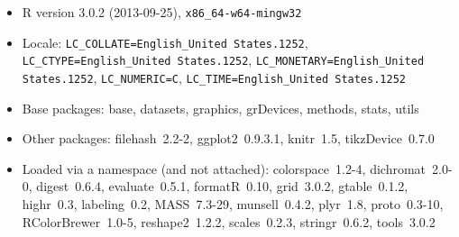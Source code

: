 \documentclass{article}\usepackage[]{graphicx}\usepackage[]{color}
\theoremstyle{rcode}
\begin{document}
\begin{itemize}\raggedright
  \item R version 3.0.2 (2013-09-25), \verb|x86_64-w64-mingw32|
  \item Locale: \verb|LC_COLLATE=English_United States.1252|, \verb|LC_CTYPE=English_United States.1252|, \verb|LC_MONETARY=English_United States.1252|, \verb|LC_NUMERIC=C|, \verb|LC_TIME=English_United States.1252|
  \item Base packages: base, datasets, graphics, grDevices,
    methods, stats, utils
  \item Other packages: filehash~2.2-2, ggplot2~0.9.3.1,
    knitr~1.5, tikzDevice~0.7.0
  \item Loaded via a namespace (and not attached):
    colorspace~1.2-4, dichromat~2.0-0, digest~0.6.4,
    evaluate~0.5.1, formatR~0.10, grid~3.0.2, gtable~0.1.2,
    highr~0.3, labeling~0.2, MASS~7.3-29, munsell~0.4.2, plyr~1.8,
    proto~0.3-10, RColorBrewer~1.0-5, reshape2~1.2.2,
    scales~0.2.3, stringr~0.6.2, tools~3.0.2
\end{itemize}
\end{document}
